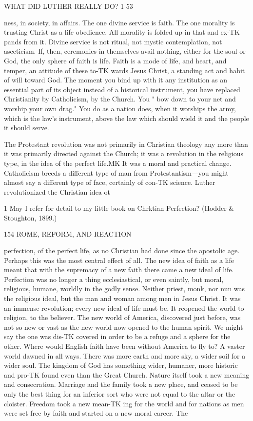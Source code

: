 \documentclass[12pt,a5paper,twoside]{book}
\begin{document}
{WHAT DID LUTHER REALLY DO? 1 53 

ness, in society, in affairs. The one divine service is 
faith. The one morality is trusting Christ as a life 
obedience. All morality is folded up in that and ex-TK
pands from it. Divine service is not ritual, not mystic 
contemplation, not asceticism. If, then, ceremonies 
in themselves avail nothing, either for the soul or God, 
the only sphere of faith is life. Faith is a mode of 
life, and heart, and temper, an attitude of these to-TK
wards Jesus Christ, a standing act and habit of will 
toward God. The moment you bind up with it any 
institution as an essential part of its object instead of 
a historical instrument, you have replaced Christianity 
by Catholicism, by the Church. You " bow down to 
your net and worship your own drag." You do as a 
nation does, when it worships the army, which is the 
law's instrument, above the law which should wield it 
and the people it should serve. 

The Protestant revolution was not primarily in 
Christian theology any more than it was primarily 
directed against the Church; it was a revolution in 
the religious type, in the idea of the perfect life.MK It 
was a moral and practical change. Catholicism breeds 
a different type of man from Protestantism---you might 
almost say a different type of face, certainly of con-TK
science. Luther revolutionized the Christian idea ot 

1 May I refer for detail to my little book on Chrktian Perfection? 
(Hodder \& Stoughton, 1899.) 



154 ROME, REFORM, AND REACTION 

perfection, of the perfect life, as no Christian had done 
since the apostolic age. Perhaps this was the most 
central effect of all. The new idea of faith as a life 
meant that with the supremacy of a new faith there 
came a new ideal of life. Perfection was no longer a 
thing ecclesiastical, or even saintly, but moral, religious, 
humane, worldly in the godly sense. Neither priest, 
monk, nor nun was the religious ideal, but the man 
and woman among men in Jesus Christ. It was an 
immense revolution; every new ideal of life must be. 
It reopened the world to religion, to the believer. 
The new world of America, discovered just before, 
was not so new or vast as the new world now opened 
to the human spirit. We might say the one was dis-TK
covered in order to be a refuge and a sphere for the 
other. Where would English faith have been without 
America to fly to? A vaster world dawned in all 
ways. There was more earth and more sky, a wider 
soil for a wider soul. The kingdom of God has 
something wider, humaner, more historic and pro-TK
found even than the Great Church. Nature itself took 
a new meaning and consecration. Marriage and the 
family took a new place, and ceased to be only the 
best thing for an inferior sort who were not equal to 
the altar or the cloister. Freedom took a new mean-TK
ing for the world and for nations as men were set free 
by faith and started on a new moral career. The 



}
\end{document}
